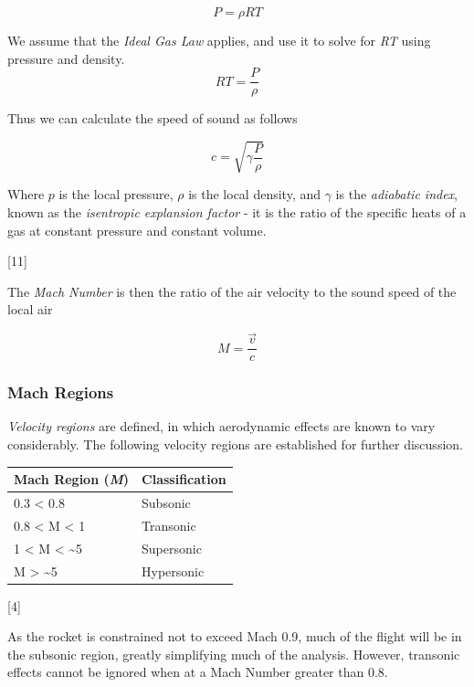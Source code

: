 \documentclass[]{article}
\begin{document}
\begin{equation}
\label{ideal_gas_law}
P = \rho R T
\end{equation}

We assume that the \emph{Ideal Gas Law} applies, and use it to solve for
\emph{RT} using pressure and density. \[ RT = \dfrac{P}{\rho} \]

Thus we can calculate the speed of sound as follows

\begin{equation}
\label{speed_of_sound}
c = \sqrt{\gamma \dfrac{P}{\rho} } 
\end{equation}

Where \(p\) is the local pressure, \(\rho\) is the local density, and
\(\gamma\) is the \emph{adiabatic index}, known as the \emph{isentropic
explansion factor} - it is the ratio of the specific heats of a gas at
constant pressure and constant volume.

{[}11{]}

The \emph{Mach Number} is then the ratio of the air velocity to the
sound speed of the local air

\begin{equation}
M = \dfrac{ \vec{v} } { c }
\end{equation}

\subsubsection{Mach Regions}\label{mach-regions}

\emph{Velocity regions} are defined, in which aerodynamic effects are
known to vary considerably. The following velocity regions are
established for further discussion.

\begin{longtable}[c]{@{}ll@{}}
\toprule
Mach Region (\emph{M}) & Classification\tabularnewline
\midrule
\endhead
0.3 \textless{} 0.8 & Subsonic\tabularnewline
0.8 \textless{} M \textless{} 1 & Transonic\tabularnewline
1 \textless{} M \textless{} \textasciitilde{}5 &
Supersonic\tabularnewline
M \textgreater{} \textasciitilde{}5 & Hypersonic\tabularnewline
\bottomrule
\end{longtable}


{[}4{]}

As the rocket is constrained not to exceed Mach 0.9, much of the flight
will be in the subsonic region, greatly simplifying much of the
analysis. However, transonic effects cannot be ignored when at a Mach
Number greater than 0.8.
\end{document}
